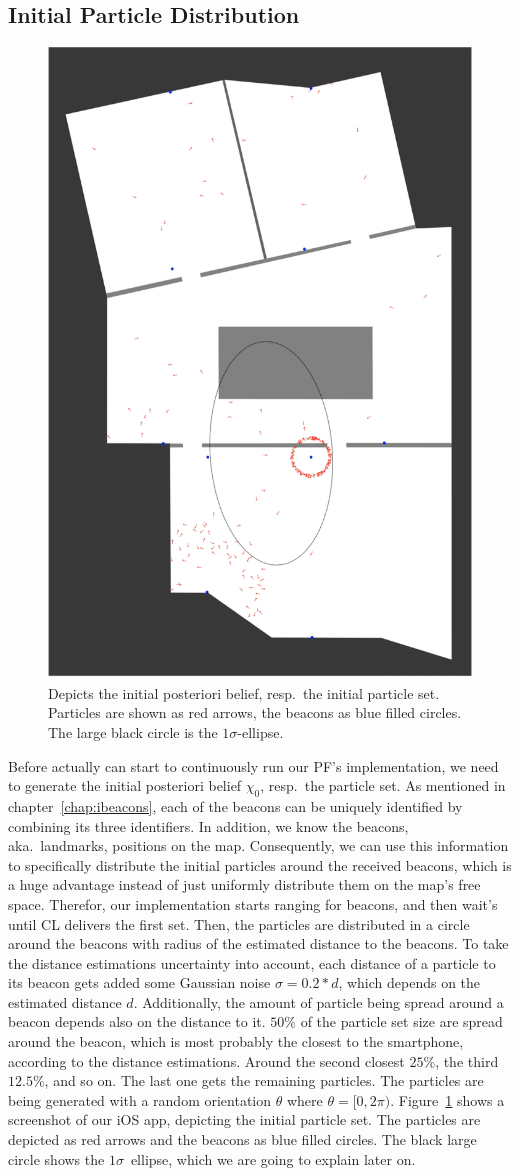 \subsection{Initial Particle Distribution}\label{sec:algo_initial}

\begin{figure}
\includegraphics[height=0.7\textwidth]{figures/algo_particle_generation}
\caption{Depicts the initial posteriori belief, resp.\ the initial particle set. Particles are shown as red arrows, the beacons as blue filled circles. The large black circle is the $1\sigma$-ellipse.}
\label{fig:pf_initialDist}
\end{figure}

Before actually can start to continuously run our \acs{PF}'s implementation, we need to generate the initial posteriori belief $\chi_0$, resp.\ the particle set. As mentioned in chapter~\ref{chap:ibeacons}, each of the beacons can be uniquely identified by combining its three identifiers. In addition, we know the beacons, aka.\ landmarks, positions on the map. Consequently, we can use this information to specifically distribute the initial particles around the received beacons, which is a huge advantage instead of just uniformly distribute them on the map's free space. Therefor, our implementation starts ranging for beacons, and then wait's until \acl{CL} delivers the first set. Then, the particles are distributed in a circle around the beacons with radius of the estimated distance to the beacons. To take the distance estimations uncertainty into account, each distance of a particle to its beacon gets added some Gaussian noise $\sigma = 0.2 * d$, which depends on the estimated distance $d$. Additionally, the amount of particle being spread around a beacon depends also on the distance to it. $50\%$ of the particle set size are spread around the beacon, which is most probably the closest to the smartphone, according to the distance estimations. Around the second closest $25\%$, the third $12.5\%$, and so on. The last one gets the remaining particles. The particles are being generated with a random orientation $\theta$ where $\theta = [0, 2\pi)$. Figure~\ref{fig:pf_initialDist} shows a screenshot of our iOS app, depicting the initial particle set. The particles are depicted as red arrows and the beacons as blue filled circles. The black large circle shows the $1\sigma$~ellipse, which we are going to explain later on.


